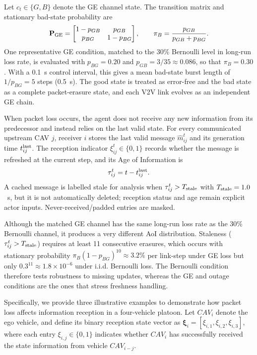 \documentclass{ieeeaccess}
\begin{document}
Let $c_t\in\{G,B\}$ denote the GE channel state. The transition matrix and stationary bad-state probability are
\begin{equation}
\mathbf P_{\rm GE}=
\begin{bmatrix}
1-p_{GB} & p_{GB}\\
p_{BG} & 1-p_{BG}
\end{bmatrix},
\qquad
\pi_B=\frac{p_{GB}}{p_{GB}+p_{BG}} .
\end{equation}
One representative GE condition, matched to the 30\% Bernoulli level in long-run loss rate, is evaluated with $p_{BG}=0.20$ and $p_{GB}=3/35\approx0.086$, so that $\pi_B=0.30$. With a 0.1~s control interval, this gives a mean bad-state burst length of $1/p_{BG}=5$ steps (0.5~s). The good state is treated as error-free and the bad state as a complete packet-erasure state, and each V2V link evolves as an independent GE chain. %


When packet loss occurs, the agent does not receive any new information from its predecessor and instead relies on the last valid state. For every communicated upstream CAV $j$, receiver $i$ stores the last valid message $\hat m_{ij}^{t}$ and its generation time $t_{ij}^{\rm last}$. The reception indicator $\xi_{ij}^{t}\in\{0,1\}$ records whether the message is refreshed at the current step, and its Age of Information is
\begin{equation}
\tau_{ij}^{t}=t-t_{ij}^{\rm last}.
\end{equation}
A cached message is labelled stale for analysis when $\tau_{ij}^{t}>T_{\rm stale}$ with $T_{\rm stale}=1.0$~s, but it is not automatically deleted; reception status and age remain explicit actor inputs. Never-received/padded entries are masked. %

Although the matched GE channel has the same long-run loss rate as the 30\% Bernoulli channel, it produces a very different AoI distribution. Staleness ($\tau_{ij}^{t}>T_{\rm stale}$) requires at least 11 consecutive erasures, which occurs with stationary probability $\pi_B(1-p_{BG})^{10}\approx3.2\%$ per link-step under GE loss but only $0.3^{11}\approx1.8\times10^{-6}$ under i.i.d. Bernoulli loss. The Bernoulli condition therefore tests robustness to missing updates, whereas the GE and outage conditions are the ones that stress freshness handling. %

Specifically, we provide three illustrative examples to demonstrate how packet loss affects information reception in a four-vehicle platoon. Let \( CAV_i \) denote the ego vehicle, and define its binary reception state vector as \( \boldsymbol{\xi}_i = [\xi_{i,1}, \xi_{i,2}, \xi_{i,3}] \), where each entry \( \xi_{i,j} \in \{0,1\} \) indicates whether \( CAV_i \) has successfully received the state information from vehicle \( CAV_{i-j} \).
\end{document}
